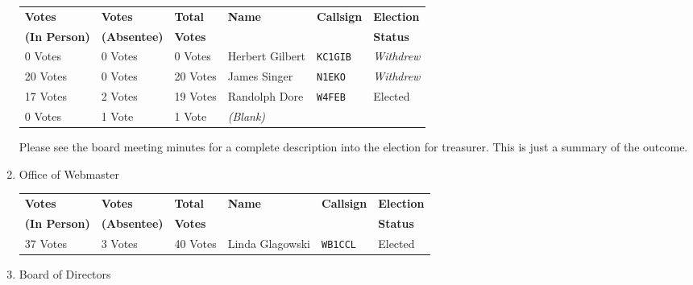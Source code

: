 \documentclass[10pt,letterpaper]{article}
\begin{document}
\begin{enumerate}
  \begin{tabular}{|p{1in}|p{.75in}|p{.6in}|p{1.2in}|p{.75in}|p{.75in}|}
  \hline
  \textbf{Votes}       & \textbf{Votes}      & \textbf{Total} & \textbf{Name} & \textbf{Callsign} & \textbf{Election} \\
  \textbf{(In Person)} & \textbf{(Absentee)} & \textbf{Votes} &               &                   & \textbf{Status}   \\ \hline
  0 Votes & 0 Votes & 0 Votes & Herbert Gilbert & \texttt{KC1GIB} & \emph{Withdrew} \textasteriskcentered{} \\ \hline
  20 Votes & 0 Votes & 20 Votes & James Singer & \texttt{N1EKO} & \emph{Withdrew} \textasteriskcentered{} \\ \hline
  17 Votes & 2 Votes & 19 Votes & Randolph Dore & \texttt{W4FEB} & Elected \\ \hline
  0 Votes & 1 Vote & 1 Vote & \emph{(Blank)} &  &  \\ \hline
  \end{tabular}

  \textasteriskcentered{} Please see the board meeting minutes for a complete description into the election for treasurer. This is just a summary of the outcome.

  \item Office of Webmaster

  \begin{tabular}{|p{1in}|p{.75in}|p{.6in}|p{1.2in}|p{.75in}|p{.75in}|}
  \hline
  \textbf{Votes}       & \textbf{Votes}      & \textbf{Total} & \textbf{Name} & \textbf{Callsign} & \textbf{Election} \\
  \textbf{(In Person)} & \textbf{(Absentee)} & \textbf{Votes} &               &                   & \textbf{Status}   \\ \hline
  37 Votes & 3 Votes & 40 Votes & Linda Glagowski & \texttt{WB1CCL} & Elected \\ \hline
  \end{tabular}

  \item Board of Directors


\end{enumerate}
\end{document}

